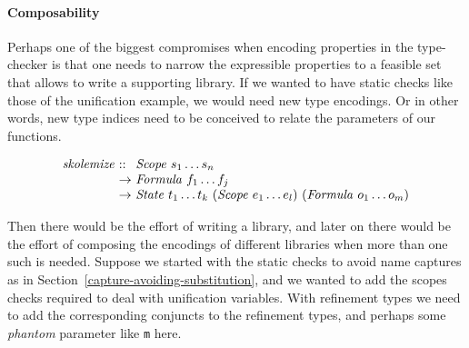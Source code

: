 \documentclass[sigconf]{acmart}
\newcommand{\tc}[1]{{\small\texttt{#1}}}
\begin{document}



\paragraph{Composability} Perhaps one of the biggest compromises when encoding properties in the type-checker
is that one needs to narrow the expressible properties to a feasible set that allows
to write a supporting library. If we wanted to have static checks like those of the
unification example, we would need new type encodings. Or in other words, new type indices
need to be conceived to relate the parameters of our functions.

$$\begin{array}{l@{\ }l@{\ }l}
    \mathit{skolemize} & \mathit{::}  & \mathit{Scope}\ s_1 \ldots s_n \\
                       & \rightarrow  & \mathit{Formula}\ f_1 \ldots f_j \\
                       & \rightarrow  & \mathit{State}\ t_1 \ldots t_k\ (\mathit{Scope}\ e_1 \ldots e_l)\ (\mathit{Formula}\ o_1 \ldots o_m)
\end{array}$$


Then there would be the effort of writing a library, and later on there would be the
effort of composing the encodings of different libraries when more than one such
is needed. Suppose we started with the static checks to avoid name captures as in
Section~\ref{capture-avoiding-substitution}, and we wanted to add the scopes checks
required to deal with unification variables. With refinement types we need to add
the corresponding conjuncts to the refinement types, and perhaps some \textit{phantom}
parameter like \tc{m} here.
\end{document}
